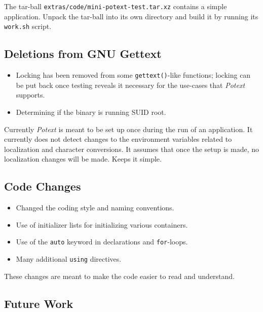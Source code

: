 \documentclass[
 11pt,
 twoside,
 a4paper,
 final                                 %
]{article}
\begin{document}
   The tar-ball
   \texttt{extras/code/mini-potext-test.tar.xz}
   contains a simple application.
   Unpack the tar-ball into its own directory
   and build it by running its
   \texttt{work.sh} script.

\subsection{Deletions from GNU Gettext}
\label{subsec:introduction_deletions}

   \begin{itemize}
      \item Locking has been removed from some \texttt{gettext()}-like
         functions; locking can be put back once testing reveals
        it necessary for the use-cases that \textsl{Potext} supports.
      \item Determining if the binary is running SUID root.
   \end{itemize}

   Currently \textsl{Potext} is meant to be set up once during
   the run of an application.
   It currently does not detect changes to the environment variables
   related to localization and character conversions.
   It assumes that once the setup is made, no localization changes
   will be made. Keeps it simple.

\subsection{Code Changes}
\label{subsec:introduction_changes}

   \begin{itemize}
      \item Changed the coding style and naming conventions.
      \item Use of initializer lists for initializing various containers.
      \item Use of the \texttt{auto} keyword in declarations and
         \texttt{for}-loops.
      \item Many additional \texttt{using} directives.
   \end{itemize}

   These changes are meant to make the code easier to read and understand.

\subsection{Future Work}
\label{subsec:introduction_future}
\end{document}
